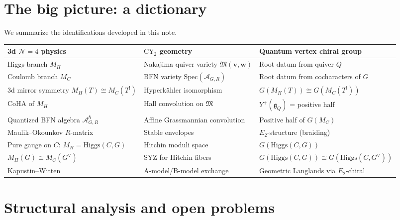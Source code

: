 \documentclass[11pt]{article}
\theoremstyle{definition}
\theoremstyle{remark}
\newcommand{\CY}{\mathrm{CY}}
\newcommand{\Spec}{\mathrm{Spec}}
\newcommand{\Higgs}{\mathrm{Higgs}}
\newcommand{\Etwo}{E_2}
\newcommand{\cN}{\mathcal{N}}
\newcommand{\frakg}{\mathfrak{g}}
\renewcommand{\hbar}{\hslash}
\begin{document}
\section{The big picture: a dictionary}
\label{sec:dictionary}

We summarize the identifications developed in this note.

\medskip

\begin{center}
\renewcommand{\arraystretch}{1.5}
\begin{tabular}{@{}p{3.8cm}p{4.2cm}p{4.5cm}@{}}
\hline
\textbf{3d $\cN=4$ physics} & \textbf{$\CY_2$ geometry} & \textbf{Quantum vertex chiral group} \\
\hline
Higgs branch $M_H$ & Nakajima quiver variety $\mathfrak{M}(\mathbf{v}, \mathbf{w})$ & Root datum from quiver $Q$ \\
Coulomb branch $M_C$ & BFN variety $\Spec(\mathcal{A}_{G,R})$ & Root datum from cocharacters of $G$ \\
3d mirror symmetry $M_H(T) \cong M_C(T^!)$ & Hyperk\"ahler isomorphism & $G(M_H(T)) \cong G(M_C(T^!))$ \\
CoHA of $M_H$ & Hall convolution on $\mathfrak{M}$ & $Y^+(\frakg_Q)$ = positive half \\
Quantized BFN algebra $\mathcal{A}^\hbar_{G,R}$ & Affine Grassmannian convolution & Positive half of $G(M_C)$ \\
Maulik--Okounkov $R$-matrix & Stable envelopes & $\Etwo$-structure (braiding) \\
Pure gauge on $C$: $M_H = \Higgs(C,G)$ & Hitchin moduli space & $G(\Higgs(C,G))$ \\
$M_H(G) \cong M_C(G^\vee)$ & SYZ for Hitchin fibers & $G(\Higgs(C,G)) \cong G(\Higgs(C,G^\vee))$ \\
Kapustin--Witten & A-model/B-model exchange & Geometric Langlands via $\Etwo$-chiral \\
\hline
\end{tabular}
\end{center}

\medskip

\section{Structural analysis and open problems}
\label{sec:open}
\end{document}
